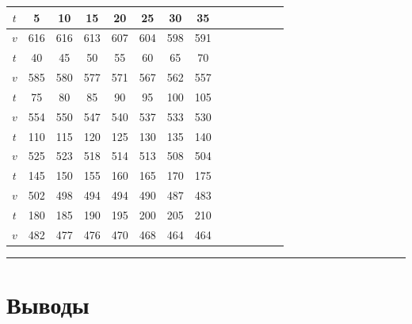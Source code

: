 \documentclass[a4paper,12pt]{article} %
\begin{document}
\begin{center}
\begin{tabular}{|c||c|c|c|c|c|c|c|c|c|c|c|c|c|}
\hline
$t$ & 5 & 10 & 15 & 20 & 25 & 30 & 35 \\ 
\hline
$v$ & 616 & 616 & 613 & 607 & 604 & 598 & 591 \\ 
\hline
\hline
$t$ & 40 & 45 & 50 & 55 & 60 & 65 & 70 \\ 
\hline
$v$ & 585 & 580 & 577 & 571 & 567 & 562 & 557 \\ 
\hline
\hline
$t$ & 75 & 80 & 85 & 90 & 95 & 100 & 105 \\ 
\hline
$v$ & 554 & 550 & 547 & 540 & 537 & 533 & 530 \\ 
\hline
\hline
$t$ & 110 & 115 & 120 & 125 & 130 & 135 & 140 \\ 
\hline
$v$ & 525 & 523 & 518 & 514 & 513 & 508 & 504 \\ 
\hline
\hline
$t$ & 145 & 150 & 155 & 160 & 165 & 170 & 175 \\ 
\hline
$v$ & 502 & 498 & 494 & 494 & 490 & 487 & 483 \\ 
\hline
\hline
$t$ & 180 & 185 & 190 & 195 & 200 & 205 & 210 \\ 
\hline
$v$ & 482 & 477 & 476 & 470 & 468 & 464 & 464 \\ 
\hline
\end{tabular}
\end{center}



\medskip\hrule\medskip


\section{Выводы}
\end{document}
